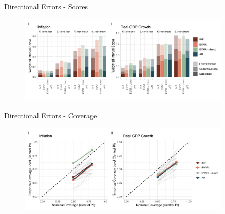\documentclass[en]{sdqbeamer}
\begin{document}

\appendix
\beginbackup
\begin{frame}{Directional Errors - Scores}
\label{errorextraction}
\begin{figure}
        \centering
        \includegraphics[width=0.9\textwidth]{figures/wis_cpigdp_directional.pdf}
    \end{figure}
\end{frame}
\begin{frame}{Directional Errors - Coverage}
\begin{figure}
        \centering
        \includegraphics[width=0.9\textwidth]{figures/coverage_directional.pdf}
    \end{figure}
\end{frame}
\end{document}
